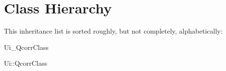 \section{Class Hierarchy}
This inheritance list is sorted roughly, but not completely, alphabetically:\begin{CompactList}
\item {}
\item Ui\_\-QcorrClass\begin{CompactList}
\item Ui::QcorrClass\begin{CompactList}
\item {}
\end{CompactList}
\end{CompactList}
\end{CompactList}
